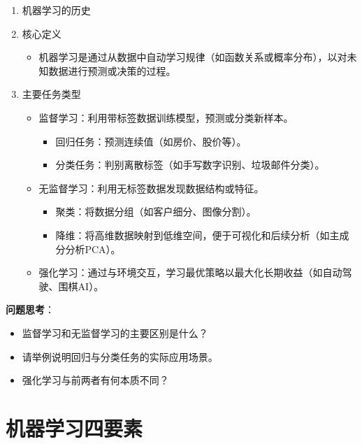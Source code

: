 \documentclass{article}
\theoremstyle{remark}
\theoremstyle{definition}
\theoremstyle{plain}
\numberwithin {equation}{section}
\numberwithin{assumption}{section}
\begin{document}
\begin{enumerate}
\begin{itemize}
      \item 它可能会借鉴生物系统的想法，例如神经网络。
      \item 它的表现可能比人类更好，也可能更差。
    \end{itemize}
  \item 机器学习的历史
  \item 核心定义
    \begin{itemize}
      \item 机器学习是通过从数据中自动学习规律（如函数关系或概率分布），以对未知数据进行预测或决策的过程。
    \end{itemize}
  \item 主要任务类型
    \begin{itemize}
      \item 监督学习：利用带标签数据训练模型，预测或分类新样本。
        \begin{itemize}
          \item 回归任务：预测连续值（如房价、股价等）。
          \item 分类任务：判别离散标签（如手写数字识别、垃圾邮件分类）。
        \end{itemize}
      \item 无监督学习：利用无标签数据发现数据结构或特征。
        \begin{itemize}
          \item 聚类：将数据分组（如客户细分、图像分割）。
          \item 降维：将高维数据映射到低维空间，便于可视化和后续分析（如主成分分析PCA）。
        \end{itemize}
      \item 强化学习：通过与环境交互，学习最优策略以最大化长期收益（如自动驾驶、围棋AI）。
    \end{itemize}
\end{enumerate}

\textbf{问题思考}：

\begin{itemize}
  \item 监督学习和无监督学习的主要区别是什么？
  \item 请举例说明回归与分类任务的实际应用场景。
  \item 强化学习与前两者有何本质不同？
\end{itemize}


\section{机器学习四要素}
\end{document}
